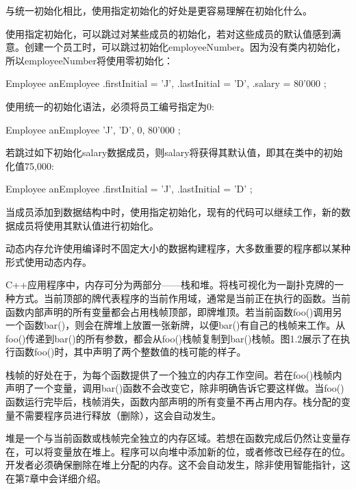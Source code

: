 与统一初始化相比，使用指定初始化的好处是更容易理解在初始化什么。

使用指定初始化，可以跳过对某些成员的初始化，若对这些成员的默认值感到满意。创建一个员工时，可以跳过初始化employeeNumber。因为没有类内初始化，所以employeeNumber将使用零初始化：

\begin{cpp}
Employee anEmployee {
    .firstInitial = 'J',
    .lastInitial = 'D',
    .salary = 80'000
};
\end{cpp}

使用统一的初始化语法，必须将员工编号指定为0:

\begin{cpp}
Employee anEmployee { 'J', 'D', 0, 80'000 };
\end{cpp}

若跳过如下初始化salary数据成员，则salary将获得其默认值，即其在类中的初始化值75,000:

\begin{cpp}
Employee anEmployee {
    .firstInitial = 'J',
    .lastInitial = 'D'
};
\end{cpp}

当成员添加到数据结构中时，使用指定初始化，现有的代码可以继续工作，新的数据成员将使用其默认值进行初始化。


动态内存允许使用编译时不固定大小的数据构建程序，大多数重要的程序都以某种形式使用动态内存。


C++应用程序中，内存可分为两部分——栈和堆。将栈可视化为一副扑克牌的一种方式。当前顶部的牌代表程序的当前作用域，通常是当前正在执行的函数。当前函数内部声明的所有变量都会占用栈帧顶部，即牌堆顶。若当前函数foo()调用另一个函数bar()，则会在牌堆上放置一张新牌，以便bar()有自己的栈帧来工作。从foo()传递到bar()的所有参数，都会从foo()栈帧复制到bar()栈帧。图1.2展示了在执行函数foo()时，其中声明了两个整数值的栈可能的样子。


栈帧的好处在于，为每个函数提供了一个独立的内存工作空间。若在foo()栈帧内声明了一个变量，调用bar()函数不会改变它，除非明确告诉它要这样做。当foo()函数运行完毕后，栈帧消失，函数内部声明的所有变量不再占用内存。栈分配的变量不需要程序员进行释放（删除），这会自动发生。

堆是一个与当前函数或栈帧完全独立的内存区域。若想在函数完成后仍然让变量存在，可以将变量放在堆上。程序可以向堆中添加新的位，或者修改已经存在的位。开发者必须确保删除在堆上分配的内存。这不会自动发生，除非使用智能指针，这在第7章中会详细介绍。

